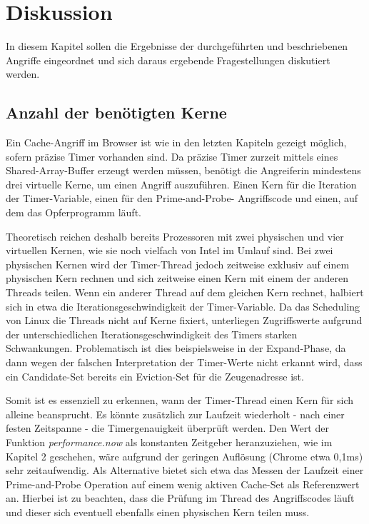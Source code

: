 \chapter{Diskussion}
\label{chapter:discussion}

In diesem Kapitel sollen die Ergebnisse der durchgeführten und beschriebenen Angriffe eingeordnet und sich daraus ergebende Fragestellungen diskutiert werden.


\section{Anzahl der benötigten Kerne}
\label{numberCores}

Ein Cache-Angriff im Browser ist wie in den letzten Kapiteln gezeigt möglich, sofern präzise Timer vorhanden sind. Da präzise Timer zurzeit mittels eines Shared-Array-Buffer erzeugt werden müssen, benötigt die Angreiferin mindestens drei virtuelle Kerne, um einen Angriff auszuführen. Einen Kern für die Iteration der Timer-Variable, einen für den Prime-and-Probe- Angriffscode und einen, auf dem das Opferprogramm läuft.

Theoretisch reichen deshalb bereits Prozessoren mit zwei physischen und vier virtuellen Kernen, wie sie noch vielfach von Intel im Umlauf sind. Bei zwei physischen Kernen wird der Timer-Thread jedoch zeitweise exklusiv auf einem physischen Kern rechnen und sich zeitweise einen Kern mit einem der anderen Threads teilen.
Wenn ein anderer Thread auf dem gleichen Kern rechnet, halbiert sich in etwa die Iterationsgeschwindigkeit der Timer-Variable.
Da das Scheduling von Linux die Threads nicht auf Kerne fixiert, unterliegen Zugriffswerte aufgrund der unterschiedlichen Iterationsgeschwindigkeit des Timers starken Schwankungen.
Problematisch ist dies beispielsweise in der Expand-Phase, da dann wegen der falschen Interpretation der Timer-Werte nicht erkannt wird, dass ein Candidate-Set bereits ein Eviction-Set für die Zeugenadresse ist.

Somit ist es essenziell zu erkennen, wann der Timer-Thread einen Kern für sich alleine beansprucht.
Es könnte zusätzlich zur Laufzeit wiederholt - nach einer festen Zeitspanne - die Timergenauigkeit überprüft werden.
Den Wert der Funktion \textit{performance.now} als konstanten Zeitgeber heranzuziehen, wie im Kapitel 2 geschehen, wäre aufgrund der geringen Auflösung (Chrome etwa 0,1ms) sehr zeitaufwendig.
Als Alternative bietet sich etwa das Messen der Laufzeit einer Prime-and-Probe Operation auf einem wenig aktiven Cache-Set als Referenzwert an.
Hierbei ist zu beachten, dass die Prüfung im Thread des Angriffscodes läuft und dieser sich eventuell ebenfalls einen physischen Kern teilen muss.

